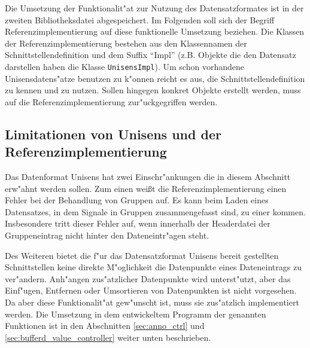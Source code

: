 
Die Umsetzung der Funktionalit"at zur Nutzung des Datensatzformates ist in der zweiten Bibliotheksdatei  abgespeichert.
Im Folgenden soll sich der Begriff Referenzimplementierung auf diese funktionelle Umsetzung beziehen.
Die Klassen der Referenzimplementierung bestehen aus den Klassennamen der Schnittstellendefinition und dem Suffix "`Impl"' (z.B. Objekte die den Datensatz darstellen haben die Klasse \verb|UnisensImpl|).
Um schon vorhandene Unisensdatens"atze benutzen zu k"onnen reicht es aus, die Schnittstellendefinition zu kennen und zu nutzen.
Sollen hingegen konkret Objekte erstellt werden, muss auf die Referenzimplementierung zur"uckgegriffen werden.

\subsection{Limitationen von Unisens und der Referenzimplementierung}

Das Datenformat Unisens hat zwei Einschr"ankungen die in diesem Abschnitt erw"ahnt werden sollen.
Zum einen wei{\ss}t die Referenzimplementierung einen Fehler bei der Behandlung von Gruppen auf.
Es kann beim Laden eines Datensatzes, in dem Signale in Gruppen zusammengefasst sind, zu einer  kommen.
Insbesondere tritt dieser Fehler auf, wenn innerhalb der Headerdatei der Gruppeneintrag nicht hinter den Dateneintr"agen steht.

Des Weiteren bietet die f"ur das Datensatzformat Unisens bereit gestellten Schnittstellen keine direkte M"oglichkeit die Datenpunkte eines Dateneintrags zu ver"andern.
Anh"angen zus"atzlicher Datenpunkte wird unterst"utzt, aber das Einf"ugen, Entfernen oder Umsortieren von Datenpunkten ist nicht vorgesehen.
Da aber diese Funktionalit"at gew"unscht ist, muss sie zus"atzlich implementiert werden.
Die Umsetzung in dem entwickeltem Programm der genannten Funktionen ist in den Abschnitten \ref{sec:anno_ctrl} und \ref{sec:bufferd_value_controller} weiter unten beschrieben.

